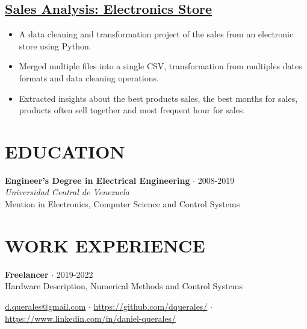 \documentclass[10pt]{article} %
\def\ucv{Universidad Central de Venezuela}
\begin{document}
\subsection*{\href{https://github.com/dquerales/DataScience/tree/main/Projects}{Sales Analysis: Electronics Store}}

\begin{itemize}
\itemsep0em
\item A data cleaning and transformation project of the sales from an electronic store using Python.
\item Merged multiple files into a single CSV, transformation from multiples dates formats and data cleaning operations.
\item Extracted insights about the best products sales, the best months for sales, products often sell together and most frequent hour for sales.
\end{itemize}

\section*{EDUCATION}

\textbf{Engineer's Degree in Electrical Engineering} $\cdot$ 2008-2019 \\ 
\emph{\ucv}\\
Mention in Electronics, Computer Science and Control Systems

\section*{WORK EXPERIENCE}

\textbf{Freelancer} $\cdot$ 2019-2022 \\ 
Hardware Description, Numerical Methods and Control Systems

\vfill
\centering
{\small
\href{mailto:d.querales@gmail.com}{d.querales@gmail.com} $\cdot$ %
\url{https://github.com/dquerales/} $\cdot$ %
\url{https://www.linkedin.com/in/daniel-querales/} %
}
\end{document}
